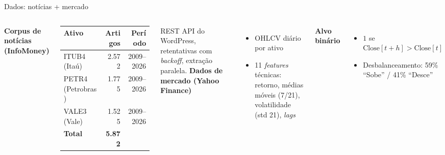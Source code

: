 \documentclass[11pt,aspectratio=169]{beamer}
\begin{document}
\begin{frame}{Dados: notícias + mercado}
  \begin{columns}[T]
    \textbf{Corpus de notícias (InfoMoney)}
    \begin{table}
      \footnotesize
      \begin{tabular}{lrr}
        \toprule
        \textbf{Ativo} & \textbf{Artigos} & \textbf{Período} \\
        \midrule
        ITUB4 (Itaú)      & 2.572 & 2009--2026 \\
        PETR4 (Petrobras) & 1.775 & 2009--2026 \\
        VALE3 (Vale)      & 1.525 & 2009--2026 \\
        \midrule
        \textbf{Total}    & \textbf{5.872} & \\
        \bottomrule
      \end{tabular}
    \end{table}
    \footnotesize REST API do WordPress, retentativas com \textit{backoff}, extração paralela.
    \textbf{Dados de mercado (Yahoo Finance)}
    \begin{itemize}
      \item OHLCV diário por ativo
      \item 11 \textit{features} técnicas: retorno, médias móveis (7/21), volatilidade (std 21), \textit{lags}
    \end{itemize}
    \textbf{Alvo binário}
    \begin{itemize}
      \item $1$ se $\text{Close}[t+h] > \text{Close}[t]$
      \item Desbalanceamento: 59\% ``Sobe'' / 41\% ``Desce''
    \end{itemize}
  \end{columns}
\end{frame}
\end{document}
